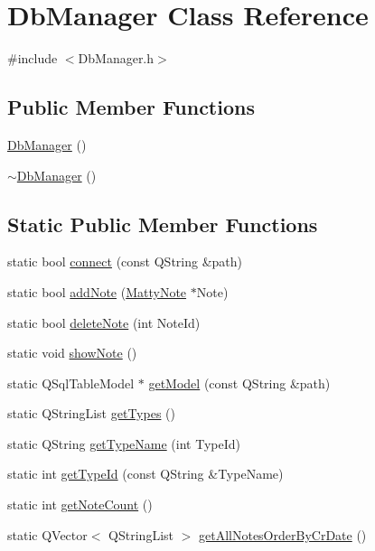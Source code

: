 \hypertarget{classDbManager}{}\section{Db\+Manager Class Reference}
\label{classDbManager}


{\ttfamily \#include $<$Db\+Manager.\+h$>$}

\subsection*{Public Member Functions}
\begin{DoxyCompactItemize}
\item 
\hyperlink{classDbManager_a0d16cf5bba931362e6c581eb1b5ba66a}{Db\+Manager} ()
\item 
\hyperlink{classDbManager_ac5cdf8e5e932d1681ab807d8f256374c}{$\sim$\+Db\+Manager} ()
\end{DoxyCompactItemize}
\subsection*{Static Public Member Functions}
\begin{DoxyCompactItemize}
\item 
static bool \hyperlink{classDbManager_abc90b3bf97dda268b4160a0662305898}{connect} (const Q\+String \&path)
\item 
static bool \hyperlink{classDbManager_a0d97afdec08f212ec39100d26d8b4273}{add\+Note} (\hyperlink{classMattyNote}{Matty\+Note} $\ast$Note)
\item 
static bool \hyperlink{classDbManager_a164849758fd05445c7af2cc04fc3569f}{delete\+Note} (int Note\+Id)
\item 
static void \hyperlink{classDbManager_a96908aac2c76d86fb1861ac8f755b962}{show\+Note} ()
\item 
static Q\+Sql\+Table\+Model $\ast$ \hyperlink{classDbManager_ac4e759380194e624382e267432de5357}{get\+Model} (const Q\+String \&path)
\item 
static Q\+String\+List \hyperlink{classDbManager_ade7585873652935bb12cb1ad546ceba2}{get\+Types} ()
\item 
static Q\+String \hyperlink{classDbManager_a6cb58e12049873e8b1b4b6ecd74dbfb6}{get\+Type\+Name} (int Type\+Id)
\item 
static int \hyperlink{classDbManager_a92ebefd0d5fae643db1fc51cc7ea0c31}{get\+Type\+Id} (const Q\+String \&Type\+Name)
\item 
static int \hyperlink{classDbManager_ae3998b50545d88a27d4361053f39b050}{get\+Note\+Count} ()
\item 
static Q\+Vector$<$ Q\+String\+List $>$ \hyperlink{classDbManager_a9b35a902ca6a35cd2589a3d1fffda94b}{get\+All\+Notes\+Order\+By\+Cr\+Date} ()
\end{DoxyCompactItemize}
